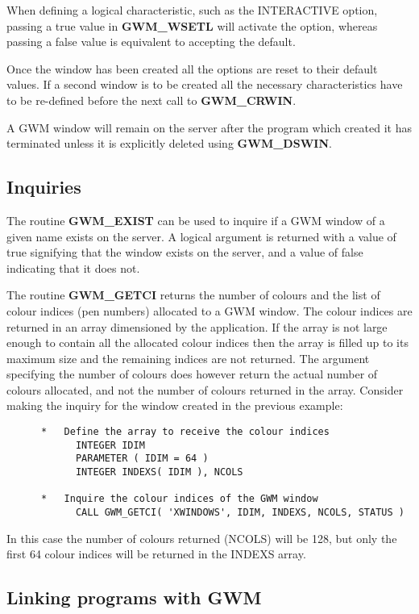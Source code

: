 When defining a logical characteristic, such as the INTERACTIVE option,
passing a true value in {\bf GWM\_WSETL} will activate the option,
whereas passing a false value is equivalent to accepting the default.

Once the window has been created all the options are reset to their
default values. If a second window is to be created all the necessary
characteristics have to be re-defined before the next call to
{\bf GWM\_CRWIN}.

A GWM window will remain on the server after the program which created
it has terminated unless it is explicitly deleted using {\bf GWM\_DSWIN}.

\subsection{Inquiries}
The routine {\bf GWM\_EXIST} can be used to inquire if a GWM window of
a given name exists on the server. A logical argument is returned with
a value of true signifying that the window exists on the server, and
a value of false indicating that it does not.

The routine {\bf GWM\_GETCI} returns the number of colours and the list
of colour indices (pen numbers) allocated to a GWM window. The colour
indices are returned in an array dimensioned by the application. If the
array is not large enough to contain all the allocated colour indices
then the array is filled up to its maximum size and the remaining indices
are not returned. The argument specifying the number of colours does
however return the actual number of colours allocated, and not the number
of colours returned in the array. Consider making the inquiry for
the window created in the previous example:

\begin{small}
\begin{verbatim}
      *   Define the array to receive the colour indices
            INTEGER IDIM
            PARAMETER ( IDIM = 64 )
            INTEGER INDEXS( IDIM ), NCOLS

      *   Inquire the colour indices of the GWM window
            CALL GWM_GETCI( 'XWINDOWS', IDIM, INDEXS, NCOLS, STATUS )
\end{verbatim}
\end{small}

In this case the number of colours returned (NCOLS) will be 128, but
only the first 64 colour indices will be returned in the INDEXS array.

\subsection{Linking programs with GWM}
